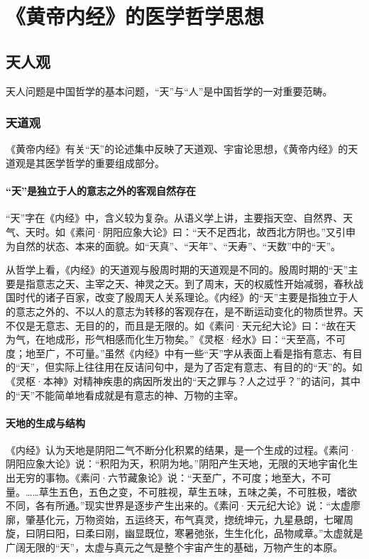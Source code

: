 \documentclass[draft,12pt]{ctexbook}
\begin{document}
\pagestyle{main}
\fi

\chapter{《黄帝内经》的医学哲学思想}%

\section{天人观}%

天人问题是中国哲学的基本问题，“天”与“人”是中国哲学的一对重要范畴。

\subsection{天道观}%

《黄帝内经》有关“天”的论述集中反映了天道观、宇宙论思想，《黄帝内经》的天道观是其医学哲学的重要组成部分。

\subsubsection{“天”是独立于人的意志之外的客观自然存在}%

“天”字在《内经》中，含义较为复杂。从语义学上讲，主要指天空、自然界、天气、天时。如《素问·阴阳应象大论》曰：“天不足西北，故西北方阴也。”又引申为自然的状态、本来的面貌。如“天真”、“天年”、“天寿”、“天数”中的“天”。

从哲学上看，《内经》的天道观与殷周时期的天道观是不同的。殷周时期的“天”主要是指意志之天、主宰之天、神灵之天。到了周末，天的权威性开始减弱，春秋战国时代的诸子百家，改变了殷周天人关系理论。《内经》的“天”主要是指独立于人的意志之外的、不以人的意志为转移的客观存在，是不断运动变化的物质世界。天不仅是无意志、无目的的，而且是无限的。如《素问·天元纪大论》曰：“故在天为气，在地成形，形气相感而化生万物矣。”《灵枢·经水》曰：“天至高，不可度；地至广，不可量。”虽然《内经》中有一些“天”字从表面上看是指有意志、有目的“天”，但实际上往往用在反诘问句中，是为了否定有意志、有目的的“天”的。如《灵枢·本神》对精神疾患的病因所发出的“天之罪与？人之过乎？”的诘问，其中的“天”不能简单地看成就是有意志的神、万物的主宰。

\subsubsection{天地的生成与结构}%

《内经》认为天地是阴阳二气不断分化积累的结果，是一个生成的过程。《素问·阴阳应象大论》说：“积阳为天，积阴为地。”阴阳产生天地，无限的天地宇宙化生出无穷的事物。《素问·六节藏象论》说：“天至广，不可度；地至大，不可量。……草生五色，五色之变，不可胜视，草生五味，五味之美，不可胜极，嗜欲不同，各有所通。”现实世界是逐步产生出来的。《素问·天元纪大论》说：“太虚廖廓，肇基化元，万物资始，五运终天，布气真灵，揔统坤元，九星悬朗，七曜周旋，曰阴曰阳，曰柔曰刚，幽显既位，寒暑弛张，生生化化，品物咸章。”太虚就是广阔无限的“天”，太虚与真元之气是整个宇宙产生的基础，万物产生的本原。
\end{document}
